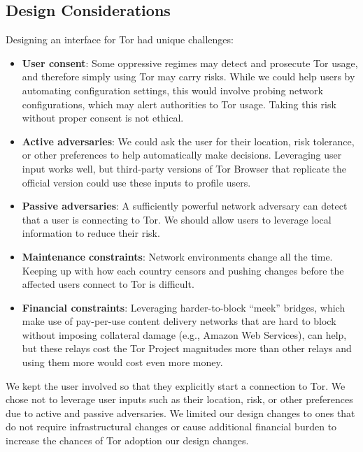 \documentclass[USenglish,oneside,twocolumn]{article}
\begin{document}
\subsection {Design Considerations} 

Designing an interface for Tor had unique challenges: \\

\begin{itemize}
\item {\bfseries User consent}: Some oppressive regimes may detect and prosecute Tor usage, and therefore simply using Tor may carry risks. While we could help users by automating configuration settings, this would involve probing network configurations, which may alert authorities to Tor usage. Taking this risk without proper consent is not ethical. 

\item{\bfseries Active adversaries}: We could ask the user for their location, risk tolerance, or other preferences to help automatically make decisions. Leveraging user input works well, but third-party versions of Tor Browser that replicate the official version could use these inputs to profile users. 

\item {\bfseries Passive adversaries}: A sufficiently powerful network adversary can detect that a user is connecting to Tor. We should allow users to leverage local information to reduce their risk.

\item{\bfseries Maintenance constraints}: Network environments change all the time. Keeping up with how each country censors and pushing changes before the affected users connect to Tor is difficult.

\item{\bfseries Financial constraints}: Leveraging harder-to-block ``meek'' bridges, which make use of pay-per-use content delivery networks that are hard to block without imposing collateral damage (e.g., Amazon Web Services), can help, but these relays cost the Tor Project magnitudes more than other relays and using them more would cost even more money.
\end{itemize}

We kept the user involved so that they explicitly start a connection to Tor. We chose not to leverage user inputs such as their location, risk, or other preferences due to active and passive adversaries. We limited our design changes to ones that do not require infrastructural changes or cause additional financial burden to increase the chances of Tor adoption our design changes. 
\end{document}
